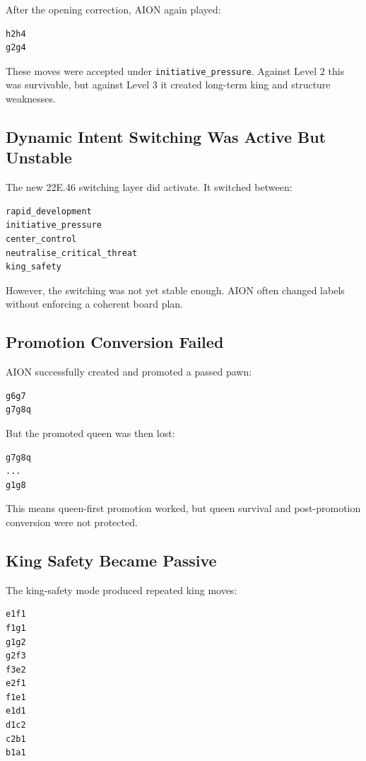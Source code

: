 \documentclass[11pt,a4paper]{article}
\begin{document}
After the opening correction, AION again played:

\begin{verbatim}
h2h4
g2g4
\end{verbatim}

These moves were accepted under \texttt{initiative\_pressure}. Against Level 2 this was survivable, but against Level 3 it created long-term king and structure weaknesses.

\subsection{Dynamic Intent Switching Was Active But Unstable}

The new 22E.46 switching layer did activate. It switched between:

\begin{verbatim}
rapid_development
initiative_pressure
center_control
neutralise_critical_threat
king_safety
\end{verbatim}

However, the switching was not yet stable enough. AION often changed labels without enforcing a coherent board plan.

\subsection{Promotion Conversion Failed}

AION successfully created and promoted a passed pawn:

\begin{verbatim}
g6g7
g7g8q
\end{verbatim}

But the promoted queen was then lost:

\begin{verbatim}
g7g8q
...
g1g8
\end{verbatim}

This means queen-first promotion worked, but queen survival and post-promotion conversion were not protected.

\subsection{King Safety Became Passive}

The king-safety mode produced repeated king moves:

\begin{verbatim}
e1f1
f1g1
g1g2
g2f3
f3e2
e2f1
f1e1
e1d1
d1c2
c2b1
b1a1
\end{verbatim}
\end{document}
